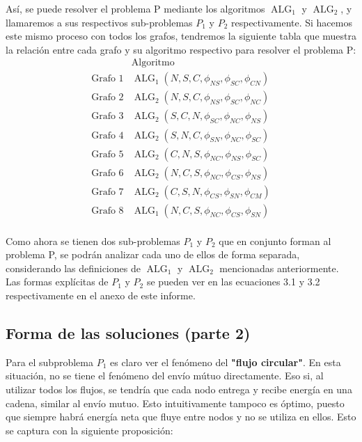 \documentclass[12pt,twoside]{article}
\begin{document}
	\hspace{1cm} As\'i, se puede resolver el problema P mediante los algoritmos \(\operatorname{ALG}_1\) y \(\operatorname{ALG}_2\), y llamaremos a sus respectivos sub-problemas \(P_1\) y \(P_2\) respectivamente. Si hacemos este mismo proceso con todos los grafos, tendremos la siguiente tabla que muestra la relaci\'on entre cada grafo y su algoritmo respectivo para resolver el problema P:
	\begin{equation*}
		\begin{array}{c|c}
			& \text{Algoritmo} \\ \hline 
			\text{Grafo 1} & \operatorname{ALG}_1(N,S,C,\phi_{NS},\phi_{SC},\phi_{CN}) \\
			\text{Grafo 2} & \operatorname{ALG}_2(N,S,C,\phi_{NS},\phi_{SC},\phi_{NC}) \\
			\text{Grafo 3} & \operatorname{ALG}_2(S,C,N,\phi_{SC},\phi_{NC},\phi_{NS}) \\
			\text{Grafo 4} & \operatorname{ALG}_2(S,N,C,\phi_{SN},\phi_{NC},\phi_{SC}) \\
			\text{Grafo 5} &  \operatorname{ALG}_2(C,N,S,\phi_{NC},\phi_{NS},\phi_{SC})  \\
			\text{Grafo 6} & \operatorname{ALG}_2(N,C,S,\phi_{NC},\phi_{CS},\phi_{NS}) \\
			\text{Grafo 7} & \operatorname{ALG}_2(C,S,N,\phi_{CS},\phi_{SN},\phi_{CM}) \\
			\text{Grafo 8} & \operatorname{ALG}_1(N,C,S,\phi_{NC},\phi_{CS},\phi_{SN}) \\
		\end{array}
	\end{equation*}
	
	\hspace{1cm}Como ahora se tienen dos sub-problemas \(P_1\) y \(P_2\) que en conjunto forman al problema P, se podr\'an analizar cada uno de ellos de forma separada, considerando las definiciones de \(\operatorname{ALG}_1\) y \(\operatorname{ALG}_2\) mencionadas anteriormente. Las formas expl\'icitas de \(P_1\) y \(P_2\) se pueden ver en las ecuaciones 3.1 y 3.2 respectivamente en el anexo de este informe.
	
	\subsection{Forma de las soluciones (parte 2)}
	\hspace{1cm} Para el subproblema \(P_1\) es claro ver el fen\'omeno del \textbf{"flujo circular"}. En esta situaci\'on, no se tiene el fen\'omeno del env\'io m\'utuo directamente. Eso si, al utilizar todos los flujos, se tendr\'ia que cada nodo entrega y recibe energ\'ia en una cadena, similar al env\'io mutuo. Esto intuitivamente tampoco es \'optimo, puesto que siempre habr\'a energ\'ia neta que fluye entre nodos y no se utiliza en ellos. Esto se captura con la siguiente proposici\'on:
	\vspace{0.4cm}
	
\end{document}
